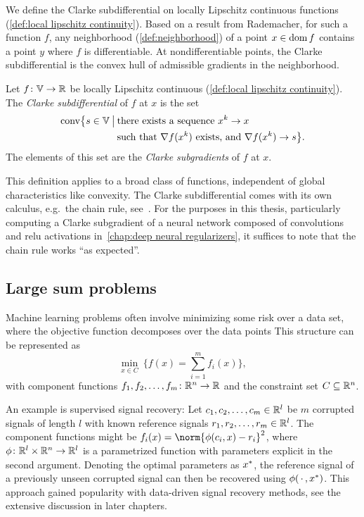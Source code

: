 We define the Clarke subdifferential on locally Lipschitz continuous functions (\cref{def:local lipschitz continuity}).
Based on a result from Rademacher, for such a function \( f \), any neighborhood (\cref{def:neighborhood}) of a point \( x \in \operatorname{dom} f \) contains a point \( y \) where \( f \) is differentiable.
At nondifferentiable points, the Clarke subdifferential is the convex hull of admissible gradients in the neighborhood.
\begin{definition}%
	\label{def:clarke subdifferential}
	Let \( f \colon \mathbb{V} \to \mathbb{R} \) be locally Lipschitz continuous (\cref{def:local lipschitz continuity}).
	The \emph{Clarke subdifferential} of \( f \) at \( x \) is the set
	\begin{equation}
		\begin{aligned}
			\ConvexHull \bigl\{ s \in \V \SetSymbol[\big] &\text{there exists a sequence}\ x^k \to x\\&\text{such that}\ \Grad f(x^k)\ \text{exists, and}\ \Grad f(x^k) \to s \bigr\}.
		\end{aligned}
	\end{equation}
	The elements of this set are the \emph{Clarke subgradients} of \( f \) at \( x \).
\end{definition}
This definition applies to a broad class of functions, independent of global characteristics like convexity.
The Clarke subdifferential comes with its own calculus, e.g.\ the chain rule, see~\cite[chapter 10]{Rockafellar1998}.
For the purposes in this thesis, particularly computing a Clarke subgradient of a neural network composed of convolutions and \gls{relu} activations in~\cref{chap:deep neural regularizers}, it suffices to note that the chain rule works \enquote{as expected}.
\subsection{Large sum problems}
Machine learning problems often involve minimizing some risk over a data set, where the objective function decomposes over the data points
This structure can be represented as
\begin{equation}
	\min_{x \in C}\ \biggl\{ f(x) = \sum_{i=\num{1}}^{m} f_i(x) \biggr\},%
	\label{eq:large sum}
\end{equation}
with component functions \( f_{\num{1}}, f_{\num{2}}, \dotsc, f_m \colon \mathbb{R}^n \to \mathbb{R} \) and the constraint set \( C \subseteq \mathbb{R}^n \).

An example is supervised signal recovery:
Let \( c_{\num{1}}, c_{\num{2}}, \dotsc, c_m \in \mathbb{R}^l \) be \( m \) corrupted signals of length \( l \) with known reference signals \( r_{\num{1}}, r_{\num{2}}, \dotsc, r_m \in \mathbb{R}^l \).
The component functions might be \( f_i(x) = \norm{\phi(c_i, x) - r_i}^{\num{2}} \), where \( \phi \colon \mathbb{R}^l \times \mathbb{R}^n \to \mathbb{R}^l \) is a parametrized function with parameters explicit in the second argument.
Denoting the optimal parameters as \( {x}^\ast \), the reference signal of a previously unseen corrupted signal can then be recovered using \( \phi(\,\cdot\,, {x}^\ast) \).
This approach gained popularity with data-driven signal recovery methods, see the extensive discussion in later chapters.

